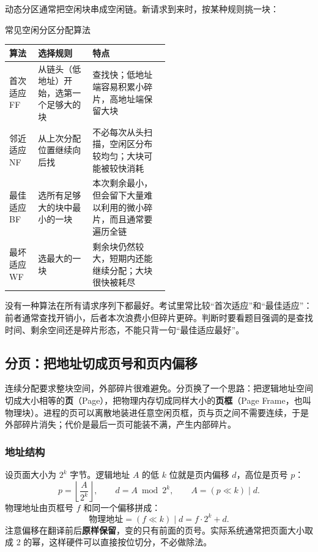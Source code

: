 动态分区通常把空闲块串成空闲链。新请求到来时，按某种规则挑一块：

\begin{tablebox}{常见空闲分区分配算法}
\centering
\begin{tabularx}{\linewidth}{|p{0.18\linewidth}|p{0.34\linewidth}|X|}
\hline
算法 & 选择规则 & 特点 \\
\hline
首次适应 FF & 从链头（低地址）开始，选第一个足够大的块 & 查找快；低地址端容易积累小碎片，高地址端保留大块 \\
\hline
邻近适应 NF & 从上次分配位置继续向后找 & 不必每次从头扫描，空闲区分布较均匀；大块可能被较快消耗 \\
\hline
最佳适应 BF & 选所有足够大的块中最小的一块 & 本次剩余最小，但会留下大量难以利用的微小碎片，而且通常要遍历全链 \\
\hline
最坏适应 WF & 选最大的一块 & 剩余块仍然较大，短期内还能继续分配；大块很快被耗尽 \\
\hline
\end{tabularx}
\end{tablebox}

没有一种算法在所有请求序列下都最好。考试里常比较“首次适应”和“最佳适应”：前者通常查找开销小，后者本次浪费小但碎片更碎。判断时要看题目强调的是查找时间、剩余空间还是碎片形态，不能只背一句“最佳适应最好”。

\subsection{分页：把地址切成页号和页内偏移}

连续分配要求整块空间，外部碎片很难避免。分页换了一个思路：把逻辑地址空间切成大小相等的\textbf{页}（Page），把物理内存切成同样大小的\textbf{页框}（Page Frame，也叫物理块）。进程的页可以离散地装进任意空闲页框，页与页之间不需要连续，于是外部碎片消失；代价是最后一页可能装不满，产生内部碎片。

\subsubsection{地址结构}

设页面大小为 $2^k$ 字节。逻辑地址 $A$ 的低 $k$ 位就是页内偏移 $d$，高位是页号 $p$：
\[
p=\left\lfloor \frac{A}{2^k}\right\rfloor,\qquad
d=A\bmod 2^k,\qquad
A=(p\ll k)\;|\;d.
\]
物理地址由页框号 $f$ 和同一个偏移拼成：
\[
\text{物理地址}=(f\ll k)\;|\;d=f\cdot 2^k+d.
\]
注意偏移在翻译前后\textbf{原样保留}，变的只有前面的页号。实际系统通常把页面大小取成 2 的幂，这样硬件可以直接按位切分，不必做除法。

